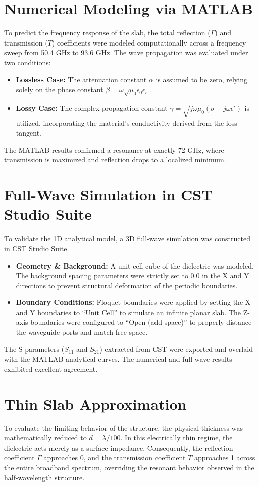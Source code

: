\documentclass[12pt, a4paper]{article}
\begin{document}
	\section{Numerical Modeling via MATLAB}
	To predict the frequency response of the slab, the total reflection ($\Gamma$) and transmission ($T$) coefficients were modeled computationally across a frequency sweep from 50.4 GHz to 93.6 GHz. The wave propagation was evaluated under two conditions:
	\begin{itemize}
		\item \textbf{Lossless Case:} The attenuation constant $\alpha$ is assumed to be zero, relying solely on the phase constant $\beta = \omega\sqrt{\mu_0 \epsilon_0 \epsilon_r}$.
		\item \textbf{Lossy Case:} The complex propagation constant $\gamma = \sqrt{j\omega\mu_0(\sigma + j\omega\epsilon')}$ is utilized, incorporating the material's conductivity derived from the loss tangent.
	\end{itemize}
	The MATLAB results confirmed a resonance at exactly 72 GHz, where transmission is maximized and reflection drops to a localized minimum.
	
	\section{Full-Wave Simulation in CST Studio Suite}
	To validate the 1D analytical model, a 3D full-wave simulation was constructed in CST Studio Suite. 
	\begin{itemize}
		\item \textbf{Geometry \& Background:} A unit cell cube of the dielectric was modeled. The background spacing parameters were strictly set to $0.0$ in the X and Y directions to prevent structural deformation of the periodic boundaries.
		\item \textbf{Boundary Conditions:} Floquet boundaries were applied by setting the X and Y boundaries to ``Unit Cell'' to simulate an infinite planar slab. The Z-axis boundaries were configured to ``Open (add space)'' to properly distance the waveguide ports and match free space.
	\end{itemize}
	The S-parameters ($S_{11}$ and $S_{21}$) extracted from CST were exported and overlaid with the MATLAB analytical curves. The numerical and full-wave results exhibited excellent agreement.
	
	\section{Thin Slab Approximation}
	To evaluate the limiting behavior of the structure, the physical thickness was mathematically reduced to $d = \lambda/100$. In this electrically thin regime, the dielectric acts merely as a surface impedance. Consequently, the reflection coefficient $\Gamma$ approaches 0, and the transmission coefficient $T$ approaches 1 across the entire broadband spectrum, overriding the resonant behavior observed in the half-wavelength structure.
\end{document}
